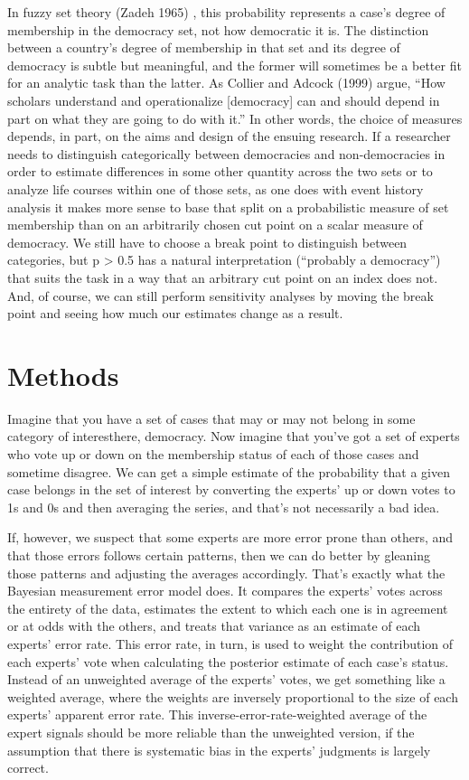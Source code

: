 \documentclass[letterpaper]{article}
\begin{document}
In fuzzy set theory (Zadeh 1965) \cite{zadeh}, this probability represents a case’s degree of membership in the democracy set, not how democratic it is. The distinction between a country’s degree of membership in that set and its degree of democracy is subtle but meaningful, and the former will sometimes be a better fit for an analytic task than the latter. As Collier and Adcock (1999) \cite{collier} argue, “How scholars understand and operationalize [democracy] can and should depend in part on what they are going to do with it.” In other words, the choice of measures depends, in part, on the aims and design of the ensuing research. If a researcher needs to distinguish categorically between democracies and non-democracies in order to estimate differences in some other quantity across the two sets \textemdash or to analyze life courses within one of those sets, as one does with event history analysis \textemdash it makes more sense to base that split on a probabilistic measure of set membership than on an arbitrarily chosen cut point on a scalar measure of democracy. We still have to choose a break point to distinguish between categories, but p > 0.5 has a natural interpretation (“probably a democracy”) that suits the task in a way that an arbitrary cut point on an index does not. And, of course, we can still perform sensitivity analyses by moving the break point and seeing how much our estimates change as a result.

\section{Methods}

Imagine that you have a set of cases that may or may not belong in some category of interest\textendash here, democracy. Now imagine that you’ve got a set of experts who vote up or down on the membership status of each of those cases and sometime disagree. We can get a simple estimate of the probability that a given case belongs in the set of interest by converting the experts’ up or down votes to 1s and 0s and then averaging the series, and that’s not necessarily a bad idea.

If, however, we suspect that some experts are more error prone than others, and that those errors follows certain patterns, then we can do better by gleaning those patterns and adjusting the averages accordingly. That’s exactly what the Bayesian measurement error model does. It compares the experts’ votes across the entirety of the data, estimates the extent to which each one is in agreement or at odds with the others, and treats that variance as an estimate of each experts’ error rate. This error rate, in turn, is used to weight the contribution of each experts’ vote when calculating the posterior estimate of each case’s status. Instead of an unweighted average of the experts’ votes, we get something like a weighted average, where the weights are inversely proportional to the size of each experts’ apparent error rate. This inverse-error-rate-weighted average of the expert signals should be more reliable than the unweighted version, if the assumption that there is systematic bias in the experts’ judgments is largely correct.
\end{document}
